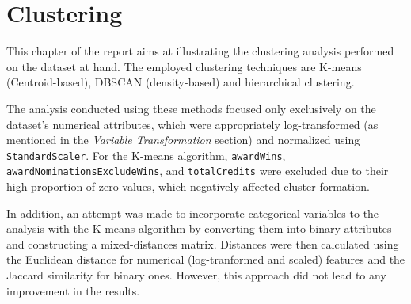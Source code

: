 \chapter{Clustering}
\label{ch:capitolo2}

This chapter of the report aims at illustrating the clustering analysis performed on the dataset at hand.
The employed clustering techniques are K-means (Centroid-based), DBSCAN (density-based) and hierarchical clustering.

The analysis conducted using these methods focused only exclusively on the dataset's numerical attributes, which were appropriately log-transformed (as mentioned in the \textit{Variable Transformation} section) and normalized using \texttt{StandardScaler}.  
For the K-means algorithm, \texttt{awardWins}, \texttt{awardNominationsExcludeWins}, and \texttt{totalCredits} were excluded due to their high proportion of zero values, which negatively affected cluster formation.

In addition, an attempt was made to incorporate categorical variables to the analysis with the K-means algorithm by converting them into binary attributes and constructing a mixed-distances matrix. 
Distances were then calculated using the Euclidean distance for numerical (log-tranformed and scaled) features and the Jaccard similarity for binary ones. 
However, this approach did not lead to any improvement in the results.

